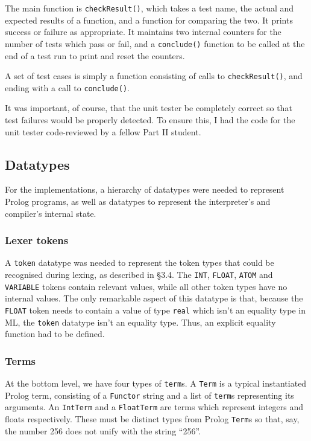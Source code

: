 \documentclass[12pt]{article}
\begin{document}
The main function is \verb|checkResult()|, which takes a test name, the actual and expected results of a function, and a function for comparing the two. 
It prints success or failure as appropriate. 
It maintains two internal counters for the number of tests which pass or fail, and a \verb|conclude()| function to be called at the end of a test run to print and reset the counters.

A set of test cases is simply a function consisting of calls to \verb|checkResult()|, and ending with a call to \verb|conclude()|.

It was important, of course, that the unit tester be completely correct so that test failures would be properly detected. 
To ensure this, I had the code for the unit tester code-reviewed by a fellow Part II student.

\subsection{Datatypes}


For the implementations, a hierarchy of datatypes were needed to represent Prolog programs, as well as datatypes to represent the interpreter's and compiler's internal state. 

\subsubsection{Lexer tokens}

A \verb|token| datatype was needed to represent the token types that could be recognised during lexing, as described in \S3.4. 
The \verb|INT|, \verb|FLOAT|, \verb|ATOM| and \verb|VARIABLE| tokens contain relevant values, while all other token types have no internal values. 
The only remarkable aspect of this datatype is that, because the \verb|FLOAT| token needs to contain a value of type \verb|real| which isn't an equality type in ML, the \verb|token| datatype isn't an equality type. 
Thus, an explicit equality function had to be defined.

\subsubsection{Terms}

At the bottom level, we have four types of \verb|term|s. A \verb|Term| is a typical instantiated Prolog term, consisting of a \verb|Functor| string and a list of \verb|term|s representing its arguments. 
An \verb|IntTerm| and a \verb|FloatTerm| are terms which represent integers and floats respectively. 
These must be distinct types from Prolog \verb|Term|s so that, say, the number 256 does not unify with the string ``256''. 
\end{document}
